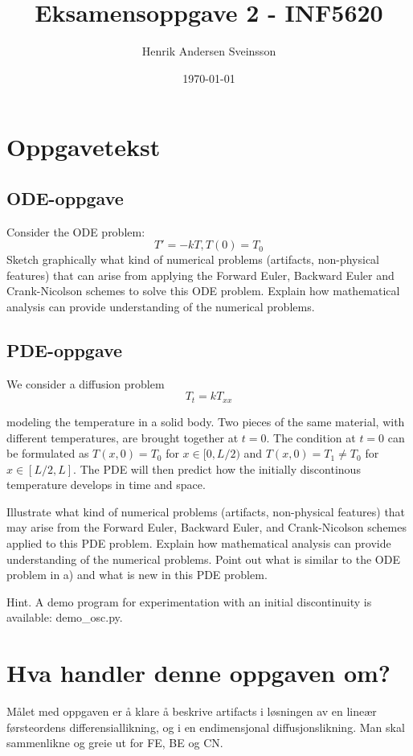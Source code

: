 \documentclass[a4paper, 10pt]{article}
\author{Henrik Andersen Sveinsson}
\title{Eksamensoppgave 2 - INF5620}
\date{\today}
\begin{document}
\maketitle

\section{Oppgavetekst}
\subsection{ODE-oppgave}
Consider the ODE problem:
\begin{equation}
	T' = -kT, T(0) = T_0
\end{equation}
Sketch graphically what kind of numerical problems (artifacts, non-physical features) that can arise from applying the Forward Euler, Backward Euler and Crank-Nicolson schemes to solve this ODE problem. Explain how mathematical analysis can provide understanding of the numerical problems.

\subsection{PDE-oppgave}
We consider a diffusion problem
\begin{equation}
	T_t = kT_{xx}
\end{equation}

modeling the temperature in a solid body. Two pieces of the same material, with different temperatures, are brought together at $t=0$. The condition at $t=0$ can be formulated as $T(x, 0) = T_0$ for $x \in [0, L/2)$ and $T(x, 0) = T_1 \neq T_0$ for $x \in [L/2, L]$. The PDE will then predict how the initially discontinous temperature develops in time and space. 

 Illustrate what kind of numerical problems (artifacts, non-physical features) that may arise from the Forward Euler, Backward Euler, and Crank-Nicolson schemes applied to this PDE problem. Explain how mathematical analysis can provide understanding of the numerical problems. Point out what is similar to the ODE problem in a) and what is new in this PDE problem.

Hint. A demo program for experimentation with an initial discontinuity is available: demo\_osc.py. 

\section{Hva handler denne oppgaven om?}
Målet med oppgaven er å klare å beskrive artifacts i løsningen av en lineær førsteordens differensiallikning, og i en endimensjonal diffusjonslikning. Man skal sammenlikne og greie ut for FE, BE og CN.
\end{document}
